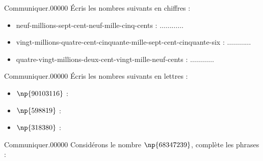 \begin{pageAD}  %
\restoregeometry %


\begin{ExoCadN}{Communiquer.}{0}{0}{0}{0}{0}
Écris les nombres suivants en chiffres :
\begin{itemize}
\item neuf-millions-sept-cent-neuf-mille-cinq-cents : $\ldots\ldots\ldots\ldots$
\item vingt-millions-quatre-cent-cinquante-mille-sept-cent-cinquante-six : $\ldots\ldots\ldots\ldots$
\item quatre-vingt-millions-deux-cent-vingt-mille-neuf-cents : $\ldots\ldots\ldots\ldots$
\end{itemize}
\end{ExoCadN}

\begin{ExoCadN}{Communiquer.}{0}{0}{0}{0}{0}
Écris les nombres suivants en lettres :
\begin{itemize}
\item $\np{90103116}$ : 
\item $\np{598819}$ : 
\item $\np{318380}$ : 
\end{itemize}
\end{ExoCadN}


\begin{ExoCadN}{Communiquer.}{0}{0}{0}{0}{0}
Considérons le nombre $\np{68347239}$, complète les phrases :
\begin{itemize}
\end{itemize}
\end{ExoCadN}


\end{pageAD}
